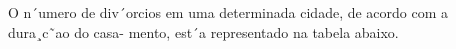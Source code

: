 \question O n´umero de div´orcios em uma determinada cidade, de acordo com a dura¸c˜ao do casa-
mento, est´a representado na tabela abaixo.